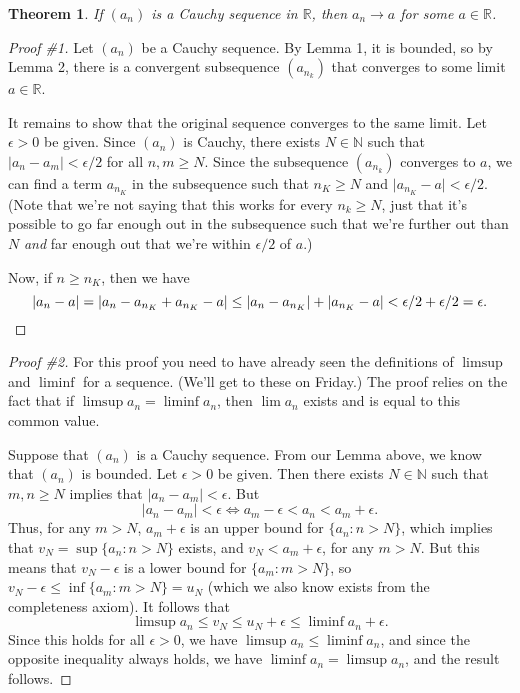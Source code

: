 \documentclass[12pt,letterpaper]{article}
\newtheorem{theorem}{Theorem}
\newcommand{\abs}[1]{\lvert #1\rvert}
\newcommand{\R}{\mathbb{R}}
\newcommand{\N}{\mathbb{N}}
\begin{document}
\begin{theorem}
 If $(a_n)$ is a Cauchy sequence in $\R$, then $a_n\to a$ for some $a\in \R$.
\end{theorem}
\begin{proof}[Proof \#1] Let $(a_n)$ be a Cauchy sequence. By Lemma 1, it is bounded, so by Lemma 2, there is a convergent subsequence $(a_{n_k})$ that converges to some limit $a\in\R$.

It remains to show that the original sequence converges to the same limit. Let $\epsilon>0$ be given. Since $(a_n)$ is Cauchy, there exists $N\in\N$ such that $\abs{a_n-a_m}<\epsilon/2$ for all $n,m\geq N$. Since the subsequence $(a_{n_k})$ converges to $a$, we can find a term $a_{n_K}$ in the subsequence such that $n_K\geq N$ and $\abs{a_{n_K}-a}<\epsilon/2$. (Note that we're not saying that this works for every $n_k\geq N$, just that it's possible to go far enough out in the subsequence such that we're further out than $N$ {\em and} far enough out that we're within $\epsilon/2$ of $a$.)

Now, if $n\geq n_K$, then we have
\[
 \abs{a_n-a} = \abs{a_n-a_{n_K}+a_{n_K}-a} \leq \abs{a_n-a_{n_K}}+\abs{a_{n_K}-a}<\epsilon/2+\epsilon/2 = \epsilon.\qedhere
\]
\end{proof}
\begin{proof}[Proof \#2] For this proof you need to have already seen the definitions of $\limsup$ and $\liminf$ for a sequence. (We'll get to these on Friday.) The proof relies on the fact that if $\limsup a_n = \liminf a_n$, then $\lim a_n$ exists and is equal to this common value.

Suppose that $(a_n)$ is a Cauchy sequence. From our Lemma above, we know that $(a_n)$ is bounded. Let $\epsilon>0$ be given. Then there exists $N\in\N$ such that $m,n\geq N$ implies that $\abs{a_n-a_m}<\epsilon$. But
\[
 \abs{a_n-a_m}<\epsilon \Leftrightarrow a_m-\epsilon<a_n<a_m+\epsilon.
\]
Thus, for any $m>N$, $a_m+\epsilon$ is an upper bound for $\{a_n:n>N\}$, which implies that $v_N = \sup\{a_n:n>N\}$ exists, and $v_N<a_m+\epsilon$, for any $m>N$. But this means that $v_N-\epsilon$ is a lower bound for $\{a_m:m>N\}$, so $v_N-\epsilon\leq \inf\{a_m:m>N\}=u_N$ (which we also know exists from the completeness axiom). It follows that
\[
 \limsup a_n\leq v_N\leq u_N+\epsilon\leq \liminf a_n+\epsilon.
\]
Since this holds for all $\epsilon>0$, we have $\limsup a_n\leq \liminf a_n$, and since the opposite inequality always holds, we have $\liminf a_n = \limsup a_n$, and the result follows.
\end{proof}
\end{document}
